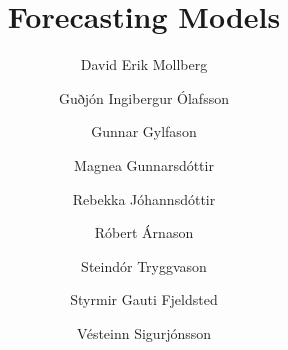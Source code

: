 \documentclass[10pt]{article}
\title{Forecasting Models}
\author{David Erik Mollberg \and Guðjón Ingibergur Ólafsson \and Gunnar Gylfason \and Magnea Gunnarsdóttir \and Rebekka Jóhannsdóttir \and Róbert Árnason \and Steindór Tryggvason \and Styrmir Gauti Fjeldsted \and Vésteinn Sigurjónsson}
\begin{document}
\maketitle

\cite{boxjenkins}





















\end{document}
